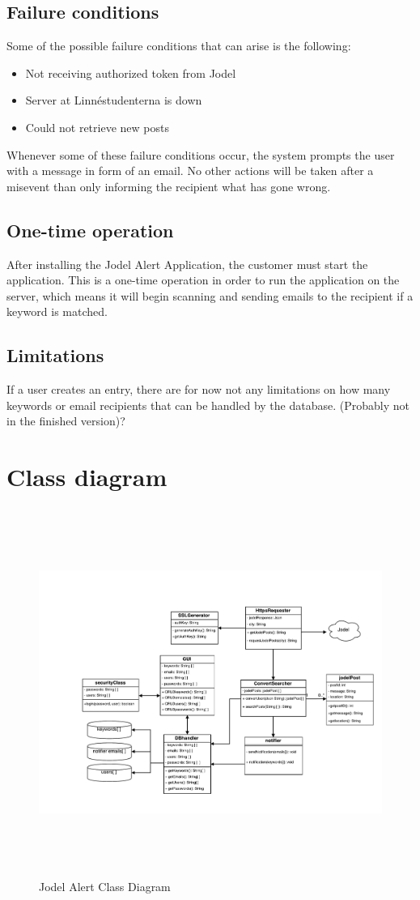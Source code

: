 \documentclass[a4paper,12pt]{article}
\begin{document}
\subsection{Failure conditions}
Some of the possible failure conditions that can arise is the following: \\
\begin{itemize}
	\item Not receiving authorized token from Jodel
	\item Server at Linnéstudenterna is down
	\item Could not retrieve new posts
\end{itemize}
Whenever some of these failure conditions occur, the system prompts the user with a message in form of an email. No other actions will be taken after a misevent than only informing the recipient what has gone wrong.

\subsection{One-time operation}
After installing the Jodel Alert Application, the customer must start the application. This is a one-time operation in order to run the application on the server, which means it will begin scanning and sending emails to the recipient if a keyword is matched.

\subsection{Limitations}
If a user creates an entry, there are for now not any limitations on how many keywords or email recipients that can be handled by the database.
(Probably not in the finished version)?
\section{Class diagram}
\begin{figure}[!h]
	\centering
	\includegraphics[height=12cm]{img/jodelUMLClassDiagram.pdf}
	\caption{Jodel Alert Class Diagram}
	\label{Class diagram}
\end{figure}
\clearpage
\end{document}
